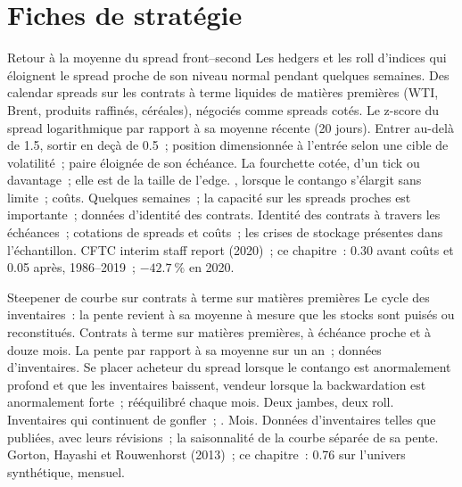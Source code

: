 \section{Fiches de stratégie}

\begin{strategyfile}{Retour à la moyenne du spread front--second}\label{strat:s1:calendar-spreads-and-curve-trades:front}
 Les hedgers et les roll d'indices qui éloignent le spread proche de son niveau normal pendant quelques semaines.
 Des calendar spreads sur les contrats à terme liquides de matières premières (WTI, Brent, produits raffinés, céréales), négociés comme spreads cotés.
 Le z-score du spread logarithmique par rapport à sa moyenne récente (20 jours).
 Entrer au-delà de 1.5, sortir en deçà de 0.5~; position dimensionnée à l'entrée selon une cible de volatilité~; paire éloignée de son échéance.
 La fourchette cotée, d'un tick ou davantage~; elle est de la taille de l'edge.
 , lorsque le contango s'élargit sans limite~; coûts.
 Quelques semaines~; la capacité sur les spreads proches est importante~; données d'identité des contrats.
 Identité des contrats à travers les échéances~; cotations de spreads et coûts~; les crises de stockage présentes dans l'échantillon.
 CFTC interim staff report (2020)~; ce chapitre~: 0.30 avant coûts et 0.05 après, 1986--2019~; $-42.7~\%$ en 2020.
\end{strategyfile}

\begin{strategyfile}{Steepener de courbe sur contrats à terme sur matières premières}\label{strat:s1:calendar-spreads-and-curve-trades:steepener}
 Le cycle des inventaires~: la pente revient à sa moyenne à mesure que les stocks sont puisés ou reconstitués.
 Contrats à terme sur matières premières, à échéance proche et à douze mois.
 La pente par rapport à sa moyenne sur un an~; données d'inventaires.
 Se placer acheteur du spread lorsque le contango est anormalement profond et que les inventaires baissent, vendeur lorsque la backwardation est anormalement forte~;
rééquilibré chaque mois.
 Deux jambes, deux roll.
 Inventaires qui continuent de gonfler~; .
 Mois.
 Données d'inventaires telles que publiées, avec leurs révisions~; la saisonnalité de la courbe séparée de sa pente.
 Gorton, Hayashi et Rouwenhorst (2013)~; ce chapitre~: 0.76 sur l'univers synthétique, mensuel.
\end{strategyfile}

